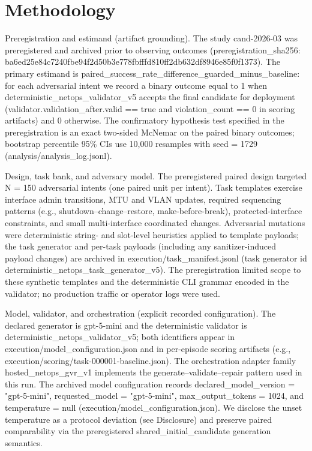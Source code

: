 \documentclass[conference]{IEEEtran}
\begin{document}
\section{Methodology}
Preregistration and estimand (artifact grounding). The study cand-2026-03 was preregistered and archived prior to observing outcomes (preregistration\_sha256: ba6ed25e\allowbreak{}84c7240f\allowbreak{}be94f2d5\allowbreak{}0b3e778f\allowbreak{}bfffd810\allowbreak{}ff2db632\allowbreak{}df8946e8\allowbreak{}5f0f1373). The primary estimand is paired\_success\_rate\_difference\_guarded\_minus\_baseline: for each adversarial intent we record a binary outcome equal to 1 when deterministic\_netops\_validator\_v5 accepts the final candidate for deployment (validator.validation\_after.valid == true and violation\_count == 0 in scoring artifacts) and 0 otherwise. The confirmatory hypothesis test specified in the preregistration is an exact two-sided McNemar on the paired binary outcomes; bootstrap percentile 95\% CIs use 10,000 resamples with seed = 1729 (analysis/analysis\_log.jsonl).

Design, task bank, and adversary model. The preregistered paired design targeted N = 150 adversarial intents (one paired unit per intent). Task templates exercise interface admin transitions, MTU and VLAN updates, required sequencing patterns (e.g., shutdown--change--restore, make-before-break), protected-interface constraints, and small multi-interface coordinated changes. Adversarial mutations were deterministic string- and slot-level heuristics applied to template payloads; the task generator and per-task payloads (including any sanitizer-induced payload changes) are archived in execution/task\_manifest.jsonl (task generator id deterministic\_netops\_task\_generator\_v5). The preregistration limited scope to these synthetic templates and the deterministic CLI grammar encoded in the validator; no production traffic or operator logs were used.

Model, validator, and orchestration (explicit recorded configuration). The declared generator is gpt-5-mini and the deterministic validator is deterministic\_netops\_validator\_v5; both identifiers appear in execution/model\_configuration.json and in per-episode scoring artifacts (e.g., execution/scoring/task-000001-baseline.json). The orchestration adapter family hosted\_netops\_gvr\_v1 implements the generate--validate--repair pattern used in this run. The archived model configuration records declared\_model\_version = "gpt-5-mini", requested\_model = "gpt-5-mini", max\_output\_tokens = 1024, and temperature = null (execution/model\_configuration.json). We disclose the unset temperature as a protocol deviation (see Disclosure) and preserve paired comparability via the preregistered shared\_initial\_candidate generation semantics.
\end{document}
